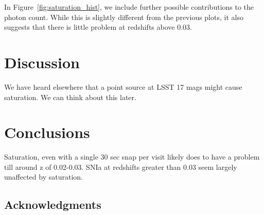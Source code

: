 \documentclass[\docopts]{\docclass}
\begin{document}
In Figure~\ref{fig:saturation_hist}, we include further possible contributions to the photon count. While this is slightly different from the previous plots, it also suggests that there is little problem at redshifts above 0.03. 
\section{Discussion}
\label{sec:discussion}
We have heard elsewhere that a point source at LSST 17 mags might cause saturation. We can think about this later.


\section{Conclusions}
\label{sec:conclusions}

Saturation, even with a single 30 sec snap per visit likely does to have a problem till around z of 0.02-0.03. SNIa at redshifts greater than 0.03 seem largely unaffected by saturation.


\subsection*{Acknowledgments}




\end{document}

